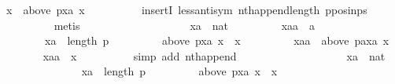 \begin{isabellebody}
\ {\isachardoublequoteopen}x\ {\isasymin}\ above\ {\isacharparenleft}{\kern0pt}p{\isacharbang}{\kern0pt}xa{\isacharparenright}{\kern0pt}\ x{\isachardoublequoteclose}\isanewline
\ \ \ \ \ \ \ \ \isamarkupfalse%
\ insertI{}\ less{\isacharunderscore}{\kern0pt}antisym\ nth{\isacharunderscore}{\kern0pt}append{\isacharunderscore}{\kern0pt}length\ p{\isacharunderscore}{\kern0pt}pos{\isacharunderscore}{\kern0pt}in{\isacharunderscore}{\kern0pt}ps\isanewline
\ \ \ \ \ \ \ \ \isamarkupfalse%
\ metis\isanewline
\ \ \ \ \isamarkupfalse%
\isanewline
\ \ \ \ \ \ \isamarkupfalse%
\isanewline
\ \ \ \ \ \ \ \ xa\ {\isacharcolon}{\kern0pt}{\isacharcolon}{\kern0pt}\ nat\ \isanewline
\ \ \ \ \ \ \ \ xaa\ {\isacharcolon}{\kern0pt}{\isacharcolon}{\kern0pt}\ {\isachardoublequoteopen}{\isacharprime}{\kern0pt}a{\isachardoublequoteclose}\isanewline
\ \ \ \ \ \ \isamarkupfalse%
\isanewline
\ \ \ \ \ \ \ \ {\isachardoublequoteopen}xa\ {\isacharless}{\kern0pt}\ length\ p{\isachardoublequoteclose}\ \isanewline
\ \ \ \ \ \ \ \ {\isachardoublequoteopen}above\ {\isacharparenleft}{\kern0pt}p{\isacharbang}{\kern0pt}xa{\isacharparenright}{\kern0pt}\ x\ {\isacharequal}{\kern0pt}\ {\isacharbraceleft}{\kern0pt}x{\isacharbraceright}{\kern0pt}{\isachardoublequoteclose}\ \isanewline
\ \ \ \ \ \ \ \ {\isachardoublequoteopen}xaa\ {\isasymin}\ above\ {\isacharparenleft}{\kern0pt}{\isacharparenleft}{\kern0pt}p{\isacharat}{\kern0pt}{\isacharbrackleft}{\kern0pt}a{\isacharbrackright}{\kern0pt}{\isacharparenright}{\kern0pt}{\isacharbang}{\kern0pt}xa{\isacharparenright}{\kern0pt}\ x{\isachardoublequoteclose}\isanewline
\ \ \ \ \ \ \isamarkupfalse%
\ {\isachardoublequoteopen}xaa\ {\isacharequal}{\kern0pt}\ x{\isachardoublequoteclose}\isanewline
\ \ \ \ \ \ \ \ \isamarkupfalse%
\ {\isacharparenleft}{\kern0pt}simp\ add{\isacharcolon}{\kern0pt}\ nth{\isacharunderscore}{\kern0pt}append{\isacharparenright}{\kern0pt}\isanewline
\ \ \ \ \isamarkupfalse%
\isanewline
\ \ \ \ \ \ \isamarkupfalse%
\isanewline
\ \ \ \ \ \ \ \ xa\ {\isacharcolon}{\kern0pt}{\isacharcolon}{\kern0pt}\ nat\isanewline
\ \ \ \ \ \ \isamarkupfalse%
\isanewline
\ \ \ \ \ \ \ \ {\isachardoublequoteopen}xa\ {\isacharless}{\kern0pt}\ length\ p{\isachardoublequoteclose}\ \isanewline
\ \ \ \ \ \ \ \ {\isachardoublequoteopen}above\ {\isacharparenleft}{\kern0pt}p{\isacharbang}{\kern0pt}xa{\isacharparenright}{\kern0pt}\ x\ {\isacharequal}{\kern0pt}\ {\isacharbraceleft}{\kern0pt}x{\isacharbraceright}{\kern0pt}{\isachardoublequoteclose}\isanewline

\end{isabellebody}
